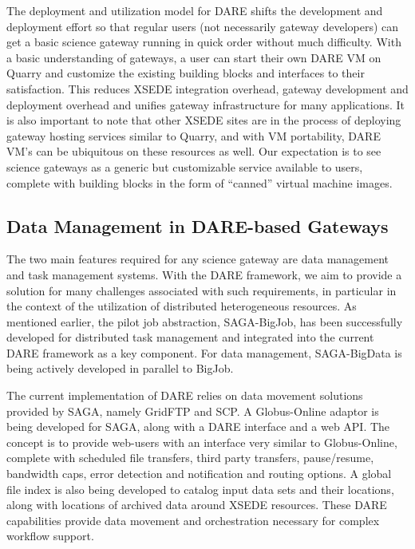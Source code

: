 \documentclass[]{svjour3}
\begin{document}
The deployment and utilization model for DARE shifts the development
and deployment effort so that regular users (not necessarily gateway
developers) can get a basic science gateway running in quick order
without much difficulty.  With a basic understanding of gateways, a
user can start their own DARE VM on Quarry and customize the existing
building blocks and interfaces to their satisfaction. This reduces
XSEDE integration overhead, gateway development and deployment
overhead and unifies gateway infrastructure for many applications. It
is also important to note that other XSEDE sites are in the process of
deploying gateway hosting services similar to Quarry, and with VM
portability, DARE VM's can be ubiquitous on these resources as
well. Our expectation is to see science gateways as a generic but
customizable service available to users, complete with building blocks
in the form of ``canned'' virtual machine images.


\subsection{Data Management in DARE-based Gateways}

The two main features required for any science gateway are data
management and task management systems.  With the DARE framework, we
aim to provide a solution for many challenges associated with such
requirements, in particular in the context of the utilization of
distributed heterogeneous resources.  As mentioned earlier, the pilot
job abstraction, SAGA-BigJob, has been successfully developed for
distributed task management and integrated into the current DARE
framework as a key component.  For data management, SAGA-BigData is
being actively developed in parallel to BigJob.

The current implementation of DARE relies on data movement solutions
provided by SAGA, namely GridFTP and SCP. A Globus-Online adaptor is
being developed for SAGA, along with a DARE interface and a web
API. The concept is to provide web-users with an interface very
similar to Globus-Online, complete with scheduled file transfers,
third party transfers, pause/resume, bandwidth caps, error detection
and notification and routing options. A global file index is also
being developed to catalog input data sets and their locations, along
with locations of archived data around XSEDE resources. These DARE
capabilities provide data movement and orchestration necessary for
complex workflow support.
\end{document}
